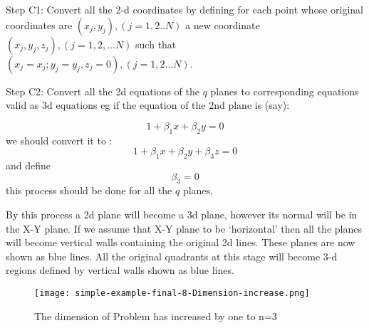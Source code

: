 \documentclass[english]{article}
\begin{document}
Step C1: Convert all the 2-d coordinates by defining for each point whose original coordinates are $(x_j,y_j), (j=1,2..N)$   a new coordinate   $(x_j,y_j,z_j), (j=1,2,...N)$  such that $ (x_j=x_j; y_j=y_j,  z_j=0) , (j=1,2...N).$



Step C2: Convert all the 2d equations of the $q$ planes to corresponding equations valid as 3d equations eg if the equation of the $2$nd plane is (say):

\begin{equation}
1+\beta_{1}x+\beta_{2}y=0
\end{equation}
we should convert it to : 
\begin{equation}
1+\beta_{1}x+\beta_{2}y + \beta_{3} z = 0
\end{equation}
and define 
\begin{equation}
 \beta_3 = 0
\end{equation}
 this process should be done for all the $q$ planes.

By this process a 2d plane will become a 3d plane, however its normal will be in the X-Y plane. If we assume that X-Y plane to be `horizontal' then all the planes will become vertical walls containing the original 2d lines. These planes are now shown as blue lines. All the original quadrants at this stage will become 3-d regions defined by vertical walls shown as blue lines. 

\medskip{}
\begin{figure}[htp]
 \begin{center}
\texttt{[image: simple-example-final-8-Dimension-increase.png]}

\caption{The dimension of Problem has increased by one to n=3}

\label{fig:fig-k} \end{center}
\end{figure} 
\end{document}
